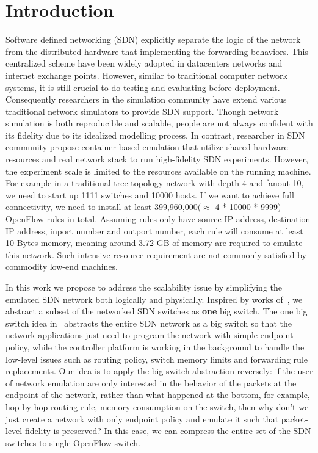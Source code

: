 \section{Introduction}

Software defined networking (SDN) explicitly separate the logic of the network
from the distributed hardware that implementing the forwarding behaviors.
This centralized scheme have been widely adopted in datacenters networks
and internet exchange points\cite{B4, Meridian, SDX}.
However, similar to traditional computer network systems, it is still crucial to do testing
and evaluating before deployment.
Consequently researchers in the simulation community have extend various
traditional network simulators to provide SDN support\cite{S3F, NS3, OPNET}.
Though network simulation is both reproducible and scalable,
people are not always confident with its fidelity due to its idealized modelling process.
In contrast, researcher in SDN community propose container-based emulation that utilize
shared hardware resources and real network stack to run high-fidelity SDN experiments\cite{Mininet}.
However, the experiment scale is limited to the resources available on the running machine.
For example in a traditional tree-topology network with depth 4 and fanout 10,
we need to start up 1111 switches and 10000 hosts.
If we want to achieve full connectivity, we need to install at least 399,960,000($\approx$ 4 * 10000 * 9999)
OpenFlow rules in total.
Assuming rules only have source IP address, destination IP address, inport number and outport number,
each rule will consume at least 10 Bytes memory, meaning around 3.72 GB of memory are required to
emulate this network.
Such intensive resource requirement are not commonly satisfied by commodity low-end machines.

In this work we propose to address the scalability issue by simplifying the emulated
SDN network both logically and physically.
Inspired by works of~\cite{OneBigSwitchAbstraction},
we abstract a subset of the networked SDN switches as \textbf{one} big switch.
The one big switch idea in~\cite{OneBigSwitchAbstraction} abstracts the entire SDN network as
a big switch so that the network applications just need to program the network with simple
endpoint policy, while the controller platform is working in the background to handle
the low-level issues such as routing policy, switch memory limits and forwarding rule replacements.
Our idea is to apply the big switch abstraction reversely:
if the user of network emulation are only interested in the behavior of the packets at the endpoint of the network, rather than what happened at the bottom,
for example, hop-by-hop routing rule, memory consumption on the switch, then why don't we
just create a network with only endpoint policy and emulate it such that packet-level
fidelity is preserved?
In this case, we can compress the entire set of the SDN switches to single OpenFlow switch.

